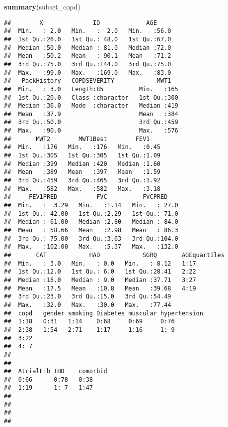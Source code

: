 \documentclass[
]{article}
\newenvironment{Shaded}{\begin{snugshade}}{\end{snugshade}}
\newcommand{\FunctionTok}[1]{\textcolor[rgb]{0.13,0.29,0.53}{\textbf{#1}}}
\newcommand{\NormalTok}[1]{#1}
\begin{document}
\begin{Shaded}
\begin{Highlighting}[]
\FunctionTok{summary}\NormalTok{(subset\_copd)}
\end{Highlighting}
\end{Shaded}

\begin{verbatim}
##        X              ID             AGE      
##  Min.   : 2.0   Min.   :  2.0   Min.   :56.0  
##  1st Qu.:26.0   1st Qu.: 48.0   1st Qu.:67.0  
##  Median :50.0   Median : 81.0   Median :72.0  
##  Mean   :50.2   Mean   : 90.1   Mean   :71.2  
##  3rd Qu.:75.0   3rd Qu.:144.0   3rd Qu.:75.0  
##  Max.   :99.0   Max.   :169.0   Max.   :83.0  
##   PackHistory   COPDSEVERITY            MWT1    
##  Min.   : 3.0   Length:85          Min.   :165  
##  1st Qu.:20.0   Class :character   1st Qu.:300  
##  Median :36.0   Mode  :character   Median :419  
##  Mean   :37.9                      Mean   :384  
##  3rd Qu.:50.0                      3rd Qu.:459  
##  Max.   :90.0                      Max.   :576  
##       MWT2        MWT1Best        FEV1     
##  Min.   :176   Min.   :176   Min.   :0.45  
##  1st Qu.:305   1st Qu.:305   1st Qu.:1.09  
##  Median :399   Median :420   Median :1.60  
##  Mean   :389   Mean   :397   Mean   :1.59  
##  3rd Qu.:459   3rd Qu.:465   3rd Qu.:1.92  
##  Max.   :582   Max.   :582   Max.   :3.18  
##     FEV1PRED           FVC          FVCPRED     
##  Min.   :  3.29   Min.   :1.14   Min.   : 27.0  
##  1st Qu.: 42.00   1st Qu.:2.29   1st Qu.: 71.0  
##  Median : 61.00   Median :2.80   Median : 84.0  
##  Mean   : 58.66   Mean   :2.98   Mean   : 86.3  
##  3rd Qu.: 75.00   3rd Qu.:3.63   3rd Qu.:104.0  
##  Max.   :102.00   Max.   :5.37   Max.   :132.0  
##       CAT            HAD            SGRQ       AGEquartiles
##  Min.   : 3.0   Min.   : 0.0   Min.   : 8.12   1:17        
##  1st Qu.:12.0   1st Qu.: 6.0   1st Qu.:28.41   2:22        
##  Median :18.0   Median : 9.0   Median :37.71   3:27        
##  Mean   :17.5   Mean   :10.8   Mean   :39.68   4:19        
##  3rd Qu.:23.0   3rd Qu.:15.0   3rd Qu.:54.49               
##  Max.   :32.0   Max.   :30.0   Max.   :77.44               
##  copd   gender smoking Diabetes muscular hypertension
##  1:18   0:31   1:14    0:68     0:69     0:76        
##  2:38   1:54   2:71    1:17     1:16     1: 9        
##  3:22                                                
##  4: 7                                                
##                                                      
##                                                      
##  AtrialFib IHD    comorbid
##  0:66      0:78   0:38    
##  1:19      1: 7   1:47    
##                           
##                           
##                           
## 
\end{verbatim}
\end{document}
